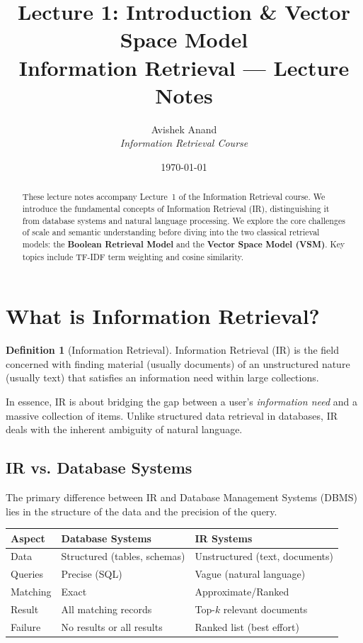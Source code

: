 \documentclass[11pt,a4paper]{article}
\title{\textbf{Lecture 1: Introduction \& Vector Space Model}\\[0.5em]\Large Information Retrieval --- Lecture Notes}
\author{Avishek Anand\\\textit{Information Retrieval Course}}
\date{\today}
\theoremstyle{definition}
\newtheorem{definition}{Definition}[section]
\theoremstyle{plain}
\begin{document}
\maketitle

\begin{abstract}
These lecture notes accompany Lecture~1 of the Information Retrieval course. We introduce the fundamental concepts of Information Retrieval (IR), distinguishing it from database systems and natural language processing. We explore the core challenges of scale and semantic understanding before diving into the two classical retrieval models: the \textbf{Boolean Retrieval Model} and the \textbf{Vector Space Model (VSM)}. Key topics include TF-IDF term weighting and cosine similarity.
\end{abstract}

\tableofcontents
\newpage

\section{What is Information Retrieval?}
\label{sec:what-is-ir}

\begin{definition}[Information Retrieval]
Information Retrieval (IR) is the field concerned with finding material (usually documents) of an unstructured nature (usually text) that satisfies an information need within large collections.
\end{definition}

In essence, IR is about bridging the gap between a user's \emph{information need} and a massive collection of items. Unlike structured data retrieval in databases, IR deals with the inherent ambiguity of natural language.

\subsection{IR vs. Database Systems}

The primary difference between IR and Database Management Systems (DBMS) lies in the structure of the data and the precision of the query.

\begin{center}
\begin{tabular}{lll}
\toprule
\textbf{Aspect} & \textbf{Database Systems} & \textbf{IR Systems} \\
\midrule
Data & Structured (tables, schemas) & Unstructured (text, documents) \\
Queries & Precise (SQL) & Vague (natural language) \\
Matching & Exact & Approximate/Ranked \\
Result & All matching records & Top-$k$ relevant documents \\
Failure & No results or all results & Ranked list (best effort) \\
\bottomrule
\end{tabular}
\end{center}
\end{document}
